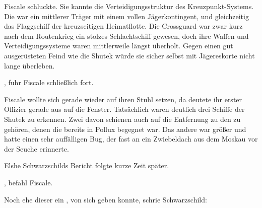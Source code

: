 \par

Fiscale schluckte. Sie kannte die Verteidigungsstruktur des Kreuzpunkt-Systems. Die  war ein mittlerer Träger mit einem vollen Jägerkontingent, und gleichzeitig das Flaggschiff der kreuzseitigen Heimatflotte. Die Crossguard war zwar kurz nach dem Routenkrieg ein stolzes Schlachtschiff gewesen, doch ihre Waffen und Verteidigungssysteme waren mittlerweile längst überholt. Gegen einen gut ausgerüsteten Feind wie die Shutek würde sie sicher selbst mit Jägereskorte nicht lange überleben.

\par

, fuhr Fiscale schließlich fort. 

\par


\par

Fiscale wollte sich gerade wieder auf ihren Stuhl setzen, da deutete ihr erster Offizier gerade aus auf die Fenster.  Tatsächlich waren deutlich drei Schiffe der Shutek zu erkennen. Zwei davon schienen auch auf die Entfernung zu den  zu gehören, denen die  bereits in Pollux begegnet war. Das andere war größer und hatte einen sehr auffälligen Bug, der fast an ein Zwiebeldach aus dem Moskau vor der Seuche erinnerte.

\par

Elshe Schwarzschilds Bericht folgte kurze Zeit später. 

\par

, befahl Fiscale. 

\par

Noch ehe dieser ein , von sich geben konnte, schrie Schwarzschild: 
